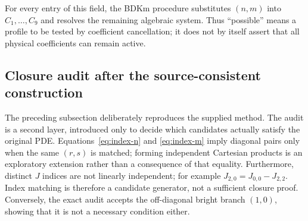 \documentclass[11pt]{article}
\begin{document}
\begin{table}[htbp]
\centering
\caption{Restricted field obtained by choosing $n$ and $m$ independently from
$\mathcal I$, reproduced in the source convention.}
\label{tab:restricted-field}
\scriptsize
\renewcommand{\arraystretch}{1.25}
\end{table}

For every entry of this field, the BDKm procedure substitutes $(n,m)$ into
$C_1,\ldots,C_9$ and resolves the remaining algebraic system.  Thus
``possible'' means a profile to be tested by coefficient cancellation; it does
not by itself assert that all physical coefficients can remain active.

\subsection{Closure audit after the source-consistent construction}
\label{sec:closure-audit}

The preceding subsection deliberately reproduces the supplied method.  The
audit is a second layer, introduced only to decide which candidates actually
satisfy the original PDE.  Equations~\eqref{eq:index-n} and
\eqref{eq:index-m} imply diagonal pairs only when the same $(r,s)$ is matched;
forming independent Cartesian products is an exploratory extension rather
than a consequence of that equality.  Furthermore, distinct $J$ indices are
not linearly independent; for example $J_{2,0}=J_{0,0}-J_{2,2}$.  Index
matching is therefore a candidate generator, not a sufficient closure proof.
Conversely, the exact audit accepts the off-diagonal bright branch $(1,0)$,
showing that it is not a necessary condition either.
\end{document}
